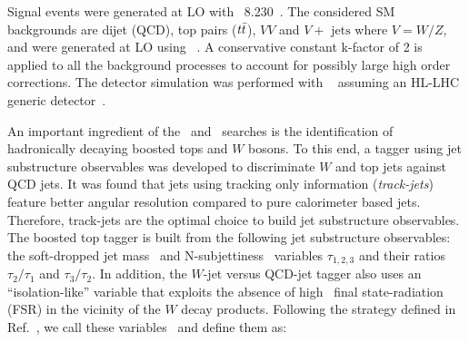 Signal events were generated at LO with \pythia~8.230~\cite{Sjostrand:2014zea}. The considered SM backgrounds are dijet (QCD), top pairs ($t\bar{t}$), $VV$ and $V+\text{ jets}$ where $V=W/Z$, and were generated at LO using \MGvATNLO{}~\cite{Alwall:2014hca}. A conservative constant k-factor of 2 is applied to all the background processes to account for possibly large high order corrections. The detector simulation was performed with \delphes~\cite{deFavereau:2013fsa} assuming an HL-LHC generic detector~\cite{hlhelhc_web}.


\label{sec:mvatagger2}
An important ingredient of the \zptt\ and \rsg\ searches is the identification of hadronically decaying boosted tops and $W$ bosons. To this end, a tagger using jet substructure observables was developed to discriminate $W$ and top jets against QCD jets. It was found that jets using tracking only information (\emph{track-jets}) feature better angular resolution compared to pure calorimeter based jets. Therefore, track-jets are the optimal choice to build jet substructure observables.
The boosted top tagger is built from the following jet substructure observables: the soft-dropped jet mass~\cite{Larkoski:2014wba} and N-subjettiness~\cite{Thaler:2010tr} variables $\tau_{1,2,3}$ and their ratios $\tau_{2}/\tau_{1}$ and $\tau_{3}/\tau_{2}$. In addition, the $W$-jet versus QCD-jet tagger also uses an ``isolation-like'' variable that exploits the absence of high \pt\ final state-radiation (FSR) in the vicinity of the $W$ decay products. Following the strategy defined in Ref.~\cite{Mangano:2016jyj}, we call these variables \eflow\ and define them as:

